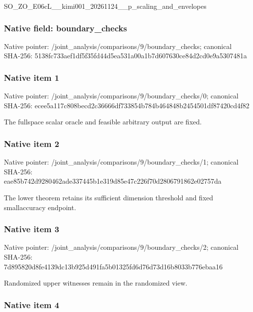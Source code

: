 \documentclass[10pt,a4paper]{article}
\begin{document}
SO\_ZO\_E06cL\_\_kimi001\_202\allowbreak{}61124\_\_p\_scaling\_and\_env\allowbreak{}elopes


\subsubsection{Native field: boundary\_checks}


Native pointer: /joint\_analysis/comparis\allowbreak{}ons/9/boundary\_checks; canonical SHA-256: 5138fc733aef1df5f35fd44d\allowbreak{}5ea531a00a1b7d607630ce84\allowbreak{}d2cd0e9a5307481a



\subsubsection{Native item 1}


Native pointer: /joint\_analysis/comparis\allowbreak{}ons/9/boundary\_checks/0; canonical SHA-256: ecee5a117c808becd2c36666\allowbreak{}df733854b784b464848b2454\allowbreak{}501df87420cd4f82


The fullspace scalar oracle and feasible arbitrary output are fixed.


\subsubsection{Native item 2}


Native pointer: /joint\_analysis/comparis\allowbreak{}ons/9/boundary\_checks/1; canonical SHA-256: eae85b742d9280462ade3374\allowbreak{}45b1e319d85e47c226f70d28\allowbreak{}06791862e02757da


The lower theorem retains its sufficient dimension threshold and fixed smallaccuracy endpoint.


\subsubsection{Native item 3}


Native pointer: /joint\_analysis/comparis\allowbreak{}ons/9/boundary\_checks/2; canonical SHA-256: 7d895820d8fe4139dc13b925\allowbreak{}d491fa5b01325fd6d76d73d1\allowbreak{}6b8033b776ebaa16


Randomized upper witnesses remain in the randomized view.


\subsubsection{Native item 4}
\end{document}
